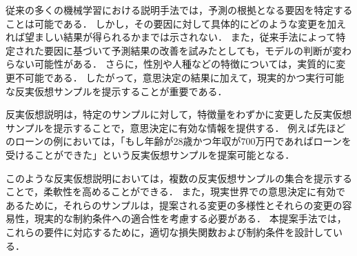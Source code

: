 \documentclass[dvipdfmx]{jreport}
\begin{document}
従来の多くの機械学習における説明手法では，予測の根拠となる要因を特定することは可能である．
しかし，その要因に対して具体的にどのような変更を加えれば望ましい結果が得られるかまでは示されない．
また，従来手法によって特定された要因に基づいて予測結果の改善を試みたとしても，モデルの判断が変わらない可能性がある．
さらに，性別や人種などの特徴については，実質的に変更不可能である．
したがって，意思決定の結果に加えて，現実的かつ実行可能な反実仮想サンプルを提示することが重要である．

反実仮想説明は，特定のサンプルに対して，特徴量をわずかに変更した反実仮想サンプルを提示することで，意思決定に有効な情報を提供する．
例えば先ほどのローンの例においては，「もし年齢が28歳かつ年収が700万円であればローンを受けることができた」という反実仮想サンプルを提案可能となる．

このような反実仮想説明においては，複数の反実仮想サンプルの集合を提示することで，柔軟性を高めることができる．
また，現実世界での意思決定に有効であるために，それらのサンプルは，提案される変更の多様性とそれらの変更の容易性，現実的な制約条件への適合性を考慮する必要がある．
本提案手法では，これらの要件に対応するために，適切な損失関数および制約条件を設計している．



\end{document}
